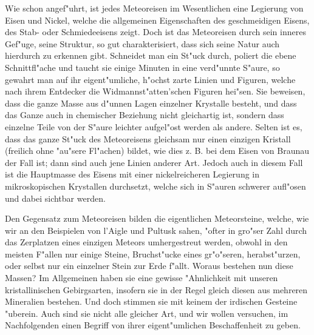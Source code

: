 \documentclass[a4paper, 11pt, oneside]{article}
\begin{document}
Wie schon angef"uhrt, ist jedes Meteoreisen im Wesentlichen eine Legierung von Eisen und Nickel, welche die allgemeinen Eigenschaften des geschmeidigen Eisens, des Stab- oder Schmiedeeisens zeigt. Doch ist das Meteoreisen durch sein inneres Gef"uge, seine Struktur, so gut charakterisiert, dass sich seine Natur auch hierdurch zu erkennen gibt. Schneidet man ein St"uck durch, poliert die ebene Schnittfl"ache und taucht sie einige Minuten in eine verd"unnte S"aure, so gewahrt man auf ihr eigent"umliche, h"ochst zarte Linien und Figuren, welche nach ihrem Entdecker die Widmannst"atten'schen Figuren hei"sen. Sie beweisen, dass die ganze Masse aus d"unnen Lagen einzelner Krystalle besteht, und dass das Ganze auch in chemischer Beziehung nicht gleichartig ist, sondern dass einzelne Teile von der S"aure leichter aufgel"ost werden als andere. Selten ist es, dass das ganze St"uck des Meteoreisens gleichsam nur einen einzigen Kristall (freilich ohne "au"sere Fl"achen) bildet, wie dies z. B. bei dem Eisen von Braunau der Fall ist; dann sind auch jene Linien anderer Art. Jedoch auch in diesem Fall ist die Hauptmasse des Eisens mit einer nickelreicheren Legierung in mikroskopischen Krystallen durchsetzt, welche sich in S"auren schwerer aufl"osen und dabei sichtbar werden.

Den Gegensatz zum Meteoreisen bilden die eigentlichen Meteorsteine, welche, wie wir an den Beispielen von l'Aigle und Pultusk sahen, "ofter in gro"ser Zahl durch das Zerplatzen eines einzigen Meteors umhergestreut werden, obwohl in den meisten F"allen nur einige Steine, Bruchst"ucke eines gr"o"seren, herabst"urzen, oder selbst nur ein einzelner Stein zur Erde f"allt. Woraus bestehen nun diese Massen? Im Allgemeinen haben sie eine gewisse "Ahnlichkeit mit unseren kristallinischen Gebirgsarten, insofern sie in der Regel gleich diesen aus mehreren Mineralien bestehen. Und doch stimmen sie mit keinem der irdischen Gesteine "uberein. Auch sind sie nicht alle gleicher Art, und wir wollen versuchen, im Nachfolgenden einen Begriff von ihrer eigent"umlichen Beschaffenheit zu geben.
\end{document}
